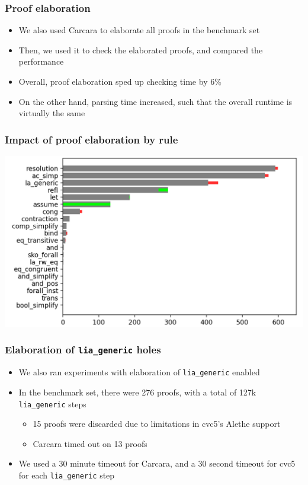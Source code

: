 \documentclass[usepdftitle=false,aspectratio=169]{beamer}
\newcommand\vitem{\vfill\item}
\begin{document}
\begin{frame}
  \frametitle{Proof elaboration}
  \begin{itemize}
    \item We also used Carcara to elaborate all proofs in the benchmark set
    \vitem Then, we used it to check the elaborated proofs, and compared the
    performance
    \vitem Overall, proof elaboration sped up checking time by 6\%
    \vitem On the other hand, parsing time increased, such that the overall
    runtime is virtually the same
  \end{itemize}
\end{frame}

\begin{frame}
  \frametitle{Impact of proof elaboration by rule}
  \centering
  \includegraphics[height=0.85\textheight]{images/by-rules-comp.png}
\end{frame}

\begin{frame}
  \frametitle{Elaboration of \texttt{lia\_generic} holes}
  \begin{itemize}
    \item We also ran experiments with elaboration of \texttt{lia\_generic}
      enabled
    \vitem In the benchmark set, there were 276 proofs, with a total of 127k
    \texttt{lia\_generic} steps
    \begin{itemize}
      \item 15 proofs were discarded due to limitations in cvc5's Alethe support
      \item Carcara timed out on 13 proofs
    \end{itemize}
    \vitem We used a 30 minute timeout for Carcara, and a 30 second timeout for
    cvc5 for each \texttt{lia\_generic} step
  \end{itemize}
\end{frame}
\end{document}
